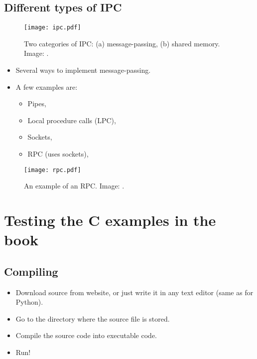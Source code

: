\documentclass{beamer}
\begin{document}
\subsection{Different types of IPC}

\begin{frame}{\insertsubsectionhead}
  \begin{figure}
    \texttt{[image: ipc.pdf]}
    \caption{Two categories of IPC: (a) message-passing, (b) shared memory.
      Image: \cite{Silberschatz2009osc}.}
  \end{figure}
\end{frame}

\begin{frame}{\insertsubsectionhead}
  \begin{itemize}
    \item Several ways to implement message-passing.
    \item A few examples are:
      \begin{itemize}
        \item Pipes,
        \item Local procedure calls (LPC),
        \item Sockets,
        \item RPC (uses sockets),
      \end{itemize}
  \end{itemize}
\end{frame}

\begin{frame}{\insertsubsectionhead}
  \begin{figure}
    \texttt{[image: rpc.pdf]}
    \caption{An example of an RPC.
      Image: \cite{Silberschatz2009osc}.}
  \end{figure}
\end{frame}


\section[Test C src]{Testing the C examples in the book}

\subsection{Compiling}

\begin{frame}{\insertsubsectionhead}
  \begin{itemize}
    \item Download source from website, or just write it in any text editor 
      (same as for Python).

    \item Go to the directory where the source file is stored.

    \item Compile the source code into executable code.

    \item Run!
  \end{itemize}
\end{frame}
\end{document}
